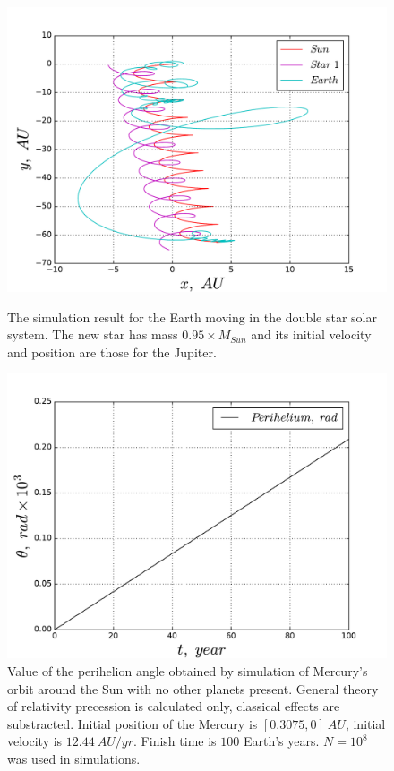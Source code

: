 \documentclass[10pt]{article}
\begin{document}
\newpage
\begin{figure}[ht]
  \begin{center}
    \includegraphics[scale=0.5]{3body}
    \caption {The simulation result for the Earth moving in the double star solar system. The new star has mass $0.95\times M_{Sun}$ and its initial velocity and position are those for the Jupiter.}
    \label{fig:3body}
  \end{center}

  
\vspace*{\floatsep}
  \begin{center}
    \includegraphics[scale=0.5]{mercury}
    \caption {Value of the perihelion angle obtained by simulation of Mercury’s orbit around the Sun with no other planets present. General theory of relativity precession is calculated only, classical effects are substracted. Initial position of the Mercury is $[0.3075,0]\ AU$, initial velocity is $12.44\ AU/yr$. Finish time is $100$ Earth's years. $N=10^8$ was used in simulations. }
    \label{fig:perihelion}
  \end{center}
\end{figure}
\clearpage
\end{document}
